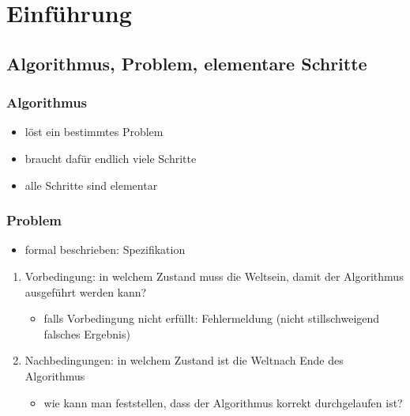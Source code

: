 \chapter{Einführung}

\section{Algorithmus, Problem, elementare Schritte}

\subsection*{Algorithmus}
    \begin{itemize}[label={-}]
        \item löst ein bestimmtes Problem
        \item braucht dafür endlich viele Schritte
        \item alle Schritte sind elementar
    \end{itemize}


\subsection*{Problem}
    \begin{itemize}[label={-}]
        \item formal beschrieben: Spezifikation
    \end{itemize}

    \medskip


    \begin{enumerate}
        \item Vorbedingung: in welchem Zustand muss die \glqq Welt\grqq sein, damit der Algorithmus ausgeführt werden kann?
        \begin{itemize}[label={$\rightarrow$}]
            \item falls Vorbedingung nicht erfüllt: Fehlermeldung (nicht stillschweigend falsches Ergebnis)
        \end{itemize}
        \item Nachbedingungen: in welchem Zustand ist die \glqq Welt\grqq nach Ende des Algorithmus
        \begin{itemize}[label={$\rightarrow$}]
            \item wie kann man feststellen, dass der Algorithmus korrekt durchgelaufen ist?
        \end{itemize}
    \end{enumerate}

